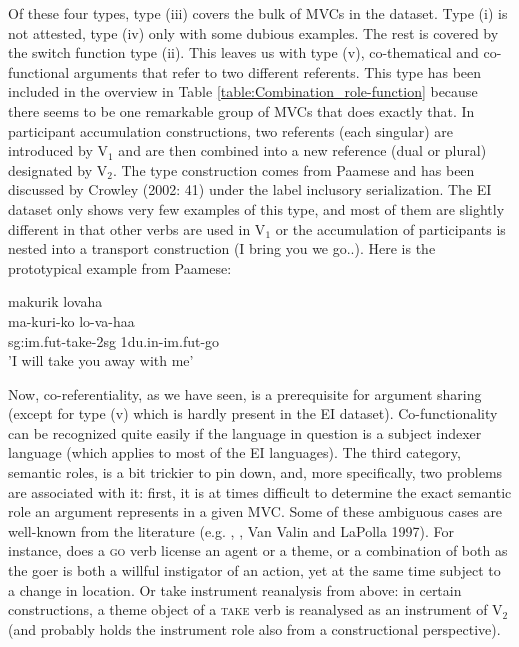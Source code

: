 Of these four types, type (iii) covers the bulk of MVCs in the dataset. Type (i) is not attested, type (iv) only with some dubious examples. The rest is covered by the switch function type (ii). This leaves us with type (v), co-thematical and co-functional arguments that refer to two different referents. This type has been included in the overview in Table \ref{table:Combination_role-function} because there seems to be one remarkable group of MVCs that does exactly that. In participant accumulation constructions, two referents (each singular) are introduced by V$_1$ and are then combined into a new reference (dual or plural) designated by V$_2$. The type construction comes from Paamese and has been discussed by Crowley (2002: 41) under the label inclusory serialization. The EI dataset only shows very few examples of this type, and most of them are slightly different in that other verbs are used in V$_1$ or the accumulation of participants is nested into a transport construction (I bring you we go..). Here is the prototypical example from Paamese:

\ea \label{paamese003}
\gll makurik lovaha \\
ma-kuri-ko lo-va-haa \\
\acs{sg}:\acs{im}.\acs{fut}-take-2\acs{sg} 1\acs{du}.\acs{in}-\acs{im}.\acs{fut}-go \\
\glft 'I will take you away with me' \\ 
\z
\xe

Now, co-referentiality, as we have seen, is a prerequisite for argument sharing (except for type (v) which is hardly present in the EI dataset). Co-functionality can be recognized quite easily if the language in question is a subject indexer language (which applies to most of the EI languages). The third category, semantic roles, is a bit trickier to pin down, and, more specifically, two problems are associated with it: first, it is at times difficult to determine the exact semantic role an argument represents in a given MVC. Some of these ambiguous cases are well-known from the literature (e.g. \cite{Dowty1979}, \cite{Jackendoff1990}, Van Valin and LaPolla 1997). For instance, does a \textsc{go} verb license an agent or a theme, or a combination of both as the goer is both a willful instigator of an action, yet at the same time subject to a change in location. Or take instrument reanalysis from above: in certain constructions, a theme object of a \textsc{take} verb is reanalysed as an instrument of V$_2$ (and probably holds the instrument role also from a constructional perspective). 

